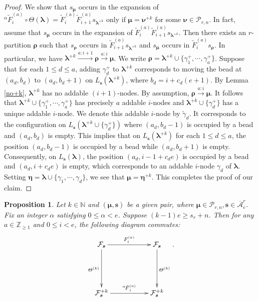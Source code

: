 \documentclass[a4paper,10pt]{amsart}
\theoremstyle{plain}
\def\bs{{\boldsymbol{s}}}
\def\N{{\mathbb N}}
\def\Z{{\mathbb Z}}
\def\PP{\mathscr{P}}
\def\blam{{\boldsymbol \lambda}}
\def\bmu{{\boldsymbol \mu}}
\def\brho{{\boldsymbol\rho}}
\def\bnu{{\boldsymbol \nu}}
\theoremstyle{plain}
\newtheorem{prop}[theorem]{Proposition}
\numberwithin{equation}{section}
\begin{document}
\begin{proof}
We show that $s_\bmu$ occurs in the expansion of ${^\alpha}\!\tilde F_i^{(a)}\circ \varTheta(\blam)=\tilde{F}^{(a)}_i\tilde{F}^{(a)}_{i+1} s_{\blam^{+k}}$ only if $\bmu=\bnu^{+k}$ for some $\bnu\in\PP_{r,n}$. In fact, assume that $s_\bmu$ occurs in the expansion of $\tilde{F}^{(a)}_i\tilde{F}^{(a)}_{i+1} s_{\blam^{+k}}$.
Then there exists an $r$-partition $\boldsymbol{\rho}$ such that $s_{\boldsymbol{\rho}}$ occurs in $\tilde{F}^{(a)}_{i+1} s_{\blam^{+k}}$ and $s_\bmu$ occurs in $\tilde{F}^{(a)}_{i}s_{\boldsymbol{\rho}}$.
In particular, we have $\blam^{+k}\xrightarrow{a:i+1} {\boldsymbol{\rho}} \xrightarrow{a:i} \bmu$.
We write $\brho=\blam^{+k}\cup\{\gamma^+_1, \cdots, \gamma^+_a\}$.
Suppose that for each $1\leq d\leq a$, adding $\gamma^+_d$ to $\blam^{+k}$ corresponds to moving the bead at $(a_d, b_d)$ to $(a_d, b_d+1)$ on $L_\bs(\blam^{+k})$, where $b_d=i+c_d(e+1)$.
By Lemma \ref{no+k}, $\blam^{+k}$ has no addable $(i+1)$-nodes. By assumption, ${\boldsymbol{\rho}} \xrightarrow{a:i} \bmu$.
It follows that $\blam^{+k} \cup \{\gamma^+_1, \cdots, \gamma^+_a\}$ has precisely $a$ addable $i$-nodes and $\blam^{+k}\cup \{\gamma^+_d\}$ has a unique addable $i$-node. We denote this addable $i$-node by $\tilde \gamma_d$. It corresponds to the configuration on $L_\bs(\blam^{+k}\cup \{\gamma^+_d\})$ where $(a_d, b_d-1)$ is occupied by a bead and $(a_d, b_d)$ is empty. This implies that on $L_\bs(\blam^{+k})$ for each $1\leq d\leq a$, the position $(a_d, b_d-1)$ is occupied by a bead while $(a_d, b_d+1)$ is empty.
Consequently, on $L_\bs(\blam)$, the position $(a_d, i-1+c_de)$ is occupied by a bead and $(a_d, i+c_de)$ is empty, which corresponds to an addable $i$-node $\gamma_d$ of $\blam$. Setting $\boldsymbol{\eta}=\blam\cup \{\gamma_1, \cdots, \gamma_d\}$, we see that $\bmu=\boldsymbol{\eta}^{+k}$. This completes the proof of our claim.
\end{proof}

\begin{prop}\label{diagram commute2}
Let $k\in\N$ and $(\bmu,\bs)$ be a given pair, where $\bmu\in\PP_{r,n}, \bs\in \overline{\mathcal A}^r_e$. Fix an integer \(\alpha\) satisfying \(0\le \alpha<e\). Suppose $(k-1)e\ge s_r+ n$. Then for any $a\in\Z_{\geq 1}$ and $0\le i<e$, the following diagram commutes:
\[
\xymatrix{
\mathcal{F}_{\bs} \ar[rr]^{F^{(a)}_i} \ar[dd]_{\varTheta^{(k)}} & & \mathcal{F}_{\bs} \ar[dd]^{\varTheta^{(k)}} \\
& & \\
\mathcal{F}_{\bs}^{+k} \ar[rr]^{{{^\alpha}\!\tilde{F}}^{(a)}_i} & & \mathcal{F}_{\bs}^{+k}
}.
\]
\end{prop}
\end{document}
